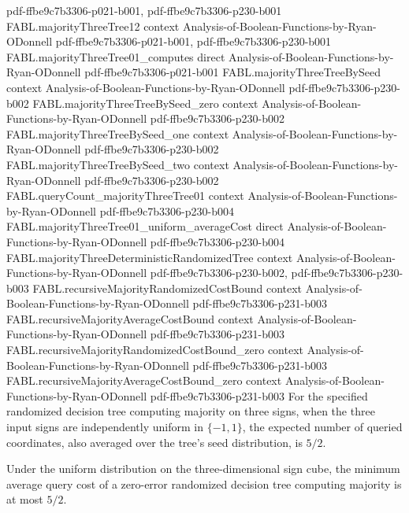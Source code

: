 \begin{theorem}
  {pdf-ffbe9c7b3306-p021-b001,
    pdf-ffbe9c7b3306-p230-b001}
\proofstep
  {FABL.majorityThreeTree12}
  {context}
  {Analysis-of-Boolean-Functions-by-Ryan-ODonnell}
  {pdf-ffbe9c7b3306-p021-b001,
    pdf-ffbe9c7b3306-p230-b001}
\proofstep
  {FABL.majorityThreeTree01_computes}
  {direct}
  {Analysis-of-Boolean-Functions-by-Ryan-ODonnell}
  {pdf-ffbe9c7b3306-p021-b001}
\proofstep
  {FABL.majorityThreeTreeBySeed}
  {context}
  {Analysis-of-Boolean-Functions-by-Ryan-ODonnell}
  {pdf-ffbe9c7b3306-p230-b002}
\proofstep
  {FABL.majorityThreeTreeBySeed_zero}
  {context}
  {Analysis-of-Boolean-Functions-by-Ryan-ODonnell}
  {pdf-ffbe9c7b3306-p230-b002}
\proofstep
  {FABL.majorityThreeTreeBySeed_one}
  {context}
  {Analysis-of-Boolean-Functions-by-Ryan-ODonnell}
  {pdf-ffbe9c7b3306-p230-b002}
\proofstep
  {FABL.majorityThreeTreeBySeed_two}
  {context}
  {Analysis-of-Boolean-Functions-by-Ryan-ODonnell}
  {pdf-ffbe9c7b3306-p230-b002}
\proofstep
  {FABL.queryCount_majorityThreeTree01}
  {context}
  {Analysis-of-Boolean-Functions-by-Ryan-ODonnell}
  {pdf-ffbe9c7b3306-p230-b004}
\proofstep
  {FABL.majorityThreeTree01_uniform_averageCost}
  {direct}
  {Analysis-of-Boolean-Functions-by-Ryan-ODonnell}
  {pdf-ffbe9c7b3306-p230-b004}
\proofstep
  {FABL.majorityThreeDeterministicRandomizedTree}
  {context}
  {Analysis-of-Boolean-Functions-by-Ryan-ODonnell}
  {pdf-ffbe9c7b3306-p230-b002,
    pdf-ffbe9c7b3306-p230-b003}
\proofstep
  {FABL.recursiveMajorityRandomizedCostBound}
  {context}
  {Analysis-of-Boolean-Functions-by-Ryan-ODonnell}
  {pdf-ffbe9c7b3306-p231-b003}
\proofstep
  {FABL.recursiveMajorityAverageCostBound}
  {context}
  {Analysis-of-Boolean-Functions-by-Ryan-ODonnell}
  {pdf-ffbe9c7b3306-p231-b003}
\proofstep
  {FABL.recursiveMajorityRandomizedCostBound_zero}
  {context}
  {Analysis-of-Boolean-Functions-by-Ryan-ODonnell}
  {pdf-ffbe9c7b3306-p231-b003}
\proofstep
  {FABL.recursiveMajorityAverageCostBound_zero}
  {context}
  {Analysis-of-Boolean-Functions-by-Ryan-ODonnell}
  {pdf-ffbe9c7b3306-p231-b003}
For the specified randomized decision tree computing majority on three signs, when the
three input signs are independently uniform in $\{-1,1\}$, the expected number of
queried coordinates, also averaged over the tree's seed distribution, is $5/2$.
\end{theorem}

\begin{theorem}
\label{FABL.averageDecisionTreeComplexity_majority_three_le}
\leanok
{}
Under the uniform distribution on the three-dimensional sign cube, the minimum average
query cost of a zero-error randomized decision tree computing majority is at most $5/2$.
\end{theorem}

